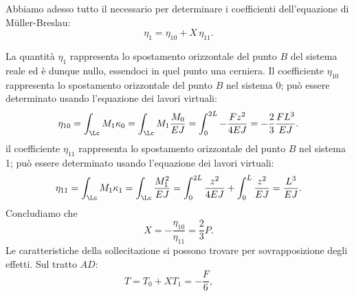 \begin{exercise}
\begin{svolgimento}
\vspace{.2cm}

Abbiamo adesso tutto il necessario per determinare i coefficienti dell'equazione di M\"uller-Breslau:
\begin{equation}
\eta_1=\eta_{10}+X\,\eta_{11}.
\end{equation}

La quantità $\eta_1$ rappresenta lo spostamento orizzontale del punto $B$ del sistema reale ed è dunque nullo, essendoci in quel punto una cerniera. Il coefficiente $\eta_{10}$ rappresenta lo spostamento orizzontale del punto $B$ nel sistema 0; può essere determinato usando l'equazione dei lavori virtuali:
\begin{equation}
\eta_{10}=\int_{\Lc}M_1 \kappa_0 =\int_{\Lc}M_1 \frac{M_0}{EJ}=\int_{0}^{2L}-\frac{Fz^2}{4EJ}=-\frac{2}{3}\frac{FL^3}{EJ}.
\end{equation}
il coefficiente $\eta_{11}$ rappresenta lo spostamento orizzontale del punto $B$ nel sistema 1; può essere determinato usando l'equazione dei lavori virtuali:
\begin{equation}
\eta_{11}=\int_{\Lc}M_1 \kappa_1=\int_{\Lc}\frac{M_1^2}{EJ}=\int_0^{2L}\frac{z^2}{4EJ}+\int_0^L\frac{z^2}{EJ}=\frac{L^3}{EJ}.
\end{equation}
Concludiamo che
\begin{equation}
X=-\frac{\eta_{10}}{\eta_{11}}=\frac{2}{3}P.
\end{equation}
Le caratteristiche della sollecitazione si possono trovare per sovrapposizione degli effetti. Sul tratto $AD$:
\begin{equation}
T=T_0+X T_1=-\frac{F}{6}, \qquad 
\end{equation}

\end{svolgimento}


\end{exercise}











